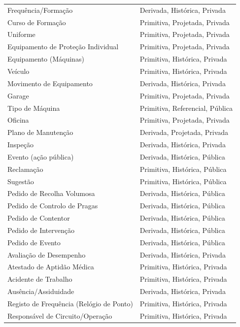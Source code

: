 \documentclass[12pt,a4paper,final]{article}
\begin{document}
\begin{longtable}{|p{6cm}|p{7cm}|}
        Frequência/Formação                      & Derivada, Histórica, Privada    \\
        Curso de Formação                        & Primitiva, Projetada, Privada   \\
        Uniforme                                 & Primitiva, Projetada, Privada   \\
        Equipamento de Proteção Individual       & Primitiva, Projetada, Privada   \\
        Equipamento (Máquinas)                   & Primitiva, Histórica, Privada   \\
        Veículo                                  & Primitiva, Histórica, Privada   \\
        Movimento de Equipamento                 & Derivada, Histórica, Privada    \\
        Garage                                   & Primitiva, Projetada, Privada   \\
        Tipo de Máquina                          & Primitiva, Referencial, Pública \\
        Oficina                                  & Primitiva, Projetada, Privada   \\
        Plano de Manutenção                      & Derivada, Projetada, Privada    \\
        Inspeção                                 & Derivada, Histórica, Privada    \\
        Evento (ação pública)                    & Derivada, Histórica, Pública    \\
        Reclamação                               & Primitiva, Histórica, Pública   \\
        Sugestão                                 & Primitiva, Histórica, Pública   \\
        Pedido de Recolha Volumosa               & Derivada, Histórica, Pública    \\
        Pedido de Controlo de Pragas             & Derivada, Histórica, Pública    \\
        Pedido de Contentor                      & Derivada, Histórica, Pública    \\
        Pedido de Intervenção                    & Derivada, Histórica, Pública    \\
        Pedido de Evento                         & Derivada, Histórica, Pública    \\
        Avaliação de Desempenho                  & Derivada, Histórica, Privada    \\
        Atestado de Aptidão Médica               & Primitiva, Histórica, Privada   \\
        Acidente de Trabalho                     & Primitiva, Histórica, Privada   \\
        Ausência/Assiduidade                     & Derivada, Histórica, Privada    \\
        Registo de Frequência (Relógio de Ponto) & Primitiva, Histórica, Privada   \\
        Responsável de Circuito/Operação         & Primitiva, Histórica, Privada   \\


\end{longtable}
\end{document}
